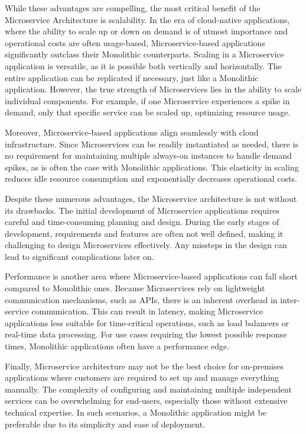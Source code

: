 While these advantages are compelling, the most critical benefit of the Microservice Architecture is scalability. In the era of cloud-native applications, where the ability to scale up or down on demand is of utmost importance and operational costs are often usage-based, Microservice-based applications significantly outclass their Monolithic counterparts. Scaling in a Microservice application is versatile, as it is possible both vertically and horizontally. The entire application can be replicated if necessary, just like a Monolithic application. However, the true strength of Microservices lies in the ability to scale individual components. For example, if one Microservice experiences a spike in demand, only that specific service can be scaled up, optimizing resource usage.

Moreover, Microservice-based applications align seamlessly with cloud infrastructure. Since Microservices can be readily instantiated as needed, there is no requirement for maintaining multiple always-on instances to handle demand spikes, as is often the case with Monolithic applications. This elasticity in scaling reduces idle resource consumption and exponentially decreases operational costs.

Despite these numerous advantages, the Microservice architecture is not without its drawbacks. The initial development of Microservice applications requires careful and time-consuming planning and design. During the early stages of development, requirements and features are often not well defined, making it challenging to design Microservices effectively. Any missteps in the design can lead to significant complications later on.

Performance is another area where Microservice-based applications can fall short compared to Monolithic ones. Because Microservices rely on lightweight communication mechanisms, such as APIs, there is an inherent overhead in inter-service communication. This can result in latency, making Microservice applications less suitable for time-critical operations, such as load balancers or real-time data processing. For use cases requiring the lowest possible response times, Monolithic applications often have a performance edge.

Finally, Microservice architecture may not be the best choice for on-premises applications where customers are required to set up and manage everything manually. The complexity of configuring and maintaining multiple independent services can be overwhelming for end-users, especially those without extensive technical expertise. In such scenarios, a Monolithic application might be preferable due to its simplicity and ease of deployment\cite{whenmicroarebad}.

